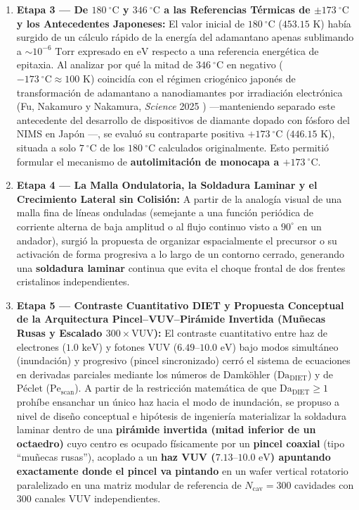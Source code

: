 \documentclass[10pt,twocolumn,a4paper]{article}
\begin{document}
\begin{enumerate}
    \item \textbf{Etapa 3 — De $180\ ^\circ\text{C}$ y $346\ ^\circ\text{C}$ a las Referencias Térmicas de $\pm 173\ ^\circ\text{C}$ y los Antecedentes Japoneses:} El valor inicial de $180\ ^\circ\text{C}$ ($453.15\text{ K}$) había surgido de un cálculo rápido de la energía del adamantano apenas sublimando a $\sim 10^{-6}\text{ Torr}$ expresado en $\text{eV}$ respecto a una referencia energética de epitaxia. Al analizar por qué la mitad de $346\ ^\circ\text{C}$ en negativo ($-173\ ^\circ\text{C} \approx 100\text{ K}$) coincidía con el régimen criogénico japonés de transformación de adamantano a nanodiamantes por irradiación electrónica (Fu, Nakamuro y Nakamura, \textit{Science} 2025 \cite{Fu2025}) —manteniendo separado este antecedente del desarrollo de dispositivos de diamante dopado con fósforo del NIMS en Japón \cite{Koizumi2001}—, se evaluó su contraparte positiva $+173\ ^\circ\text{C}$ ($446.15\text{ K}$), situada a solo $7\ ^\circ\text{C}$ de los $180\ ^\circ\text{C}$ calculados originalmente. Esto permitió formular el mecanismo de \textbf{autolimitación de monocapa a $+173\ ^\circ\text{C}$}.
    \item \textbf{Etapa 4 — La Malla Ondulatoria, la Soldadura Laminar y el Crecimiento Lateral sin Colisión:} A partir de la analogía visual de una malla fina de líneas onduladas (semejante a una función periódica de corriente alterna de baja amplitud o al flujo continuo visto a $90^\circ$ en un andador), surgió la propuesta de organizar espacialmente el precursor o su activación de forma progresiva a lo largo de un contorno cerrado, generando una \textbf{soldadura laminar} continua que evita el choque frontal de dos frentes cristalinos independientes.
    \item \textbf{Etapa 5 — Contraste Cuantitativo DIET y Propuesta Conceptual de la Arquitectura Pincel--VUV--Pirámide Invertida (Muñecas Rusas y Escalado $300\times\text{VUV}$):} El contraste cuantitativo entre haz de electrones ($1.0\text{ keV}$) y fotones VUV ($6.49\text{--}10.0\text{ eV}$) bajo modos simultáneo (inundación) y progresivo (pincel sincronizado) cerró el sistema de ecuaciones en derivadas parciales mediante los números de Damköhler ($\text{Da}_{\text{DIET}}$) y de Péclet ($\text{Pe}_{\text{scan}}$). A partir de la restricción matemática de que $\text{Da}_{\text{DIET}} \ge 1$ prohíbe ensanchar un único haz hacia el modo de inundación, se propuso a nivel de diseño conceptual e hipótesis de ingeniería materializar la soldadura laminar dentro de una \textbf{pirámide invertida (mitad inferior de un octaedro)} cuyo centro es ocupado físicamente por un \textbf{pincel coaxial} (tipo ``muñecas rusas''), acoplado a un \textbf{haz VUV ($7.13\text{--}10.0\text{ eV}$) apuntando exactamente donde el pincel va pintando} en un wafer vertical rotatorio paralelizado en una matriz modular de referencia de $N_{\text{cav}} = 300$ cavidades con $300$ canales VUV independientes.
\end{enumerate}
\end{document}
